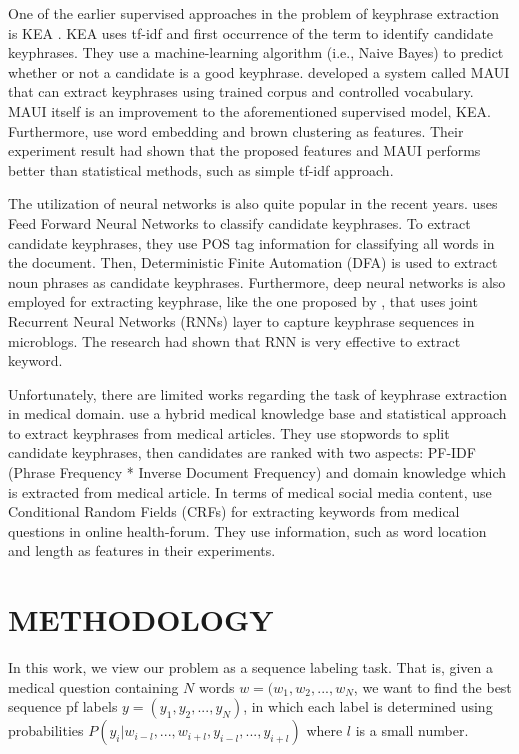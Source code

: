 One of the earlier supervised approaches in the problem of keyphrase extraction is KEA \cite{witten1999kea}. KEA uses tf-idf and first occurrence of the term to identify candidate keyphrases. They use a machine-learning algorithm (i.e., Naive Bayes) to predict whether or not a candidate is a good keyphrase. \cite{medelyan2009human} developed a system called MAUI that can extract keyphrases using trained corpus and controlled vocabulary. MAUI itself is an improvement to the aforementioned supervised model, KEA. Furthermore, \cite{marujoMAUI} use word embedding and brown clustering as features. Their experiment result had shown that the proposed features and MAUI performs better than statistical methods, such as simple tf-idf approach.

The utilization of neural networks is also quite popular in the recent years. \cite{ekpNeuralNetworks} uses Feed Forward Neural Networks to classify candidate keyphrases. To extract candidate keyphrases, they use POS tag information for classifying all words in the document. Then, Deterministic Finite Automation (DFA) is used to extract noun phrases as candidate keyphrases. Furthermore, deep neural networks is also employed for extracting keyphrase, like the one proposed by \cite{zhang2016keyphrase}, that uses joint Recurrent Neural Networks (RNNs) layer to capture keyphrase sequences in microblogs. The research had shown that RNN is very effective to extract keyword.

Unfortunately, there are limited works regarding the task of keyphrase extraction in medical domain. \cite{ekpMedicalDocumentHybrid} use a hybrid medical knowledge base and statistical approach to extract keyphrases from medical articles. They use stopwords to split candidate keyphrases, then candidates are ranked with two aspects: PF-IDF (Phrase Frequency * Inverse Document Frequency) and domain knowledge which is extracted from medical article. In terms of medical social media content, \cite{cao2010automatically} use Conditional Random Fields (CRFs) for extracting keywords from medical questions in online health-forum. They use information, such as word location and length as features in their experiments.

\section{METHODOLOGY}
In this work, we view our problem as a sequence labeling task. That is, given a medical question containing $N$ words $w = (w_1, w_2,...,w_N$, we want to find the best sequence pf labels $y = (y_1, y_2,..., y_N)$, in which each label is determined using probabilities $P(y_i|w_{i-l},...,w_{i+l},y_{i-l},...,y_{i+l})$ where $l$ is a small number.

